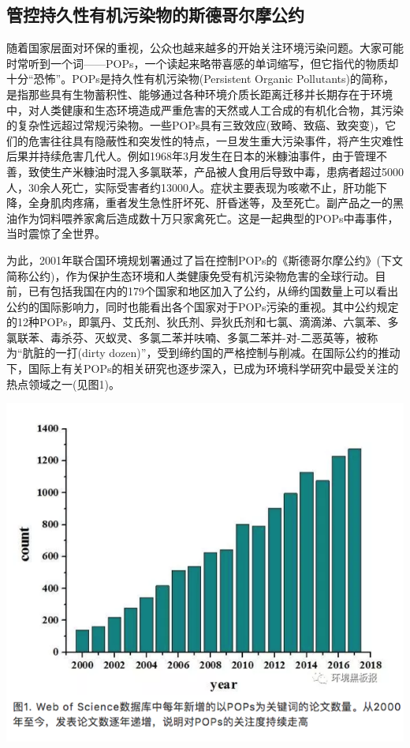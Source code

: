 \documentclass[
]{book}
\begin{document}
\hypertarget{ux7ba1ux63a7ux6301ux4e45ux6027ux6709ux673aux6c61ux67d3ux7269ux7684ux65afux5fb7ux54e5ux5c14ux6469ux516cux7ea6}{%
\subsection{管控持久性有机污染物的斯德哥尔摩公约}\label{ux7ba1ux63a7ux6301ux4e45ux6027ux6709ux673aux6c61ux67d3ux7269ux7684ux65afux5fb7ux54e5ux5c14ux6469ux516cux7ea6}}

随着国家层面对环保的重视，公众也越来越多的开始关注环境污染问题。大家可能时常听到一个词------POPs，一个读起来略带喜感的单词缩写，但它指代的物质却十分``恐怖''。POPs是持久性有机污染物(Persistent Organic Pollutants)的简称，是指那些具有生物蓄积性、能够通过各种环境介质长距离迁移并长期存在于环境中，对人类健康和生态环境造成严重危害的天然或人工合成的有机化合物，其污染的复杂性远超过常规污染物。一些POPs具有三致效应(致畸、致癌、致突变)，它们的危害往往具有隐蔽性和突发性的特点，一旦发生重大污染事件，将产生灾难性后果并持续危害几代人。例如1968年3月发生在日本的米糠油事件，由于管理不善，致使生产米糠油时混入多氯联苯，产品被人食用后导致中毒，患病者超过5000人，30余人死亡，实际受害者约13000人。症状主要表现为咳嗽不止，肝功能下降，全身肌肉疼痛，重者发生急性肝坏死、肝昏迷等，及至死亡。副产品之一的黑油作为饲料喂养家禽后造成数十万只家禽死亡。这是一起典型的POPs中毒事件，当时震惊了全世界。

为此，2001年联合国环境规划署通过了旨在控制POPs的《斯德哥尔摩公约》(下文简称公约)，作为保护生态环境和人类健康免受有机污染物危害的全球行动。目前，已有包括我国在内的179个国家和地区加入了公约，从缔约国数量上可以看出公约的国际影响力，同时也能看出各个国家对于POPs污染的重视。其中公约规定的12种POPs，即氯丹、艾氏剂、狄氏剂、异狄氏剂和七氯、滴滴涕、六氯苯、多氯联苯、毒杀芬、灭蚁灵、多氯二苯并呋喃、多氯二苯并-对-二恶英等，被称为``肮脏的一打(dirty dozen)''，受到缔约国的严格控制与削减。在国际公约的推动下，国际上有关POPs的相关研究也逐步深入，已成为环境科学研究中最受关注的热点领域之一(见图1)。

\includegraphics[width=8.33in]{images/gongyue1}
\end{document}
